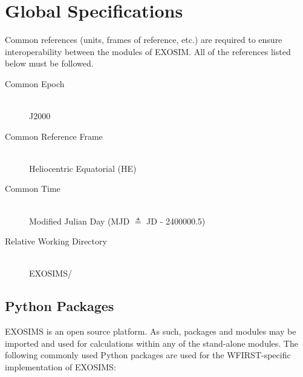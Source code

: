 \documentclass[cleanfoot]{asme2ej}
\begin{document}

\section{Global Specifications}
Common references (units, frames of reference, etc.) are required to ensure interoperability between the modules of EXOSIM.  All of the references listed below must be followed.

\begin{description}
    \item[Common Epoch] \hfill \\ J2000
    \item[Common Reference Frame] \hfill \\ Heliocentric Equatorial (HE)
    \item[Common Time] \hfill \\ Modified Julian Day (MJD $\triangleq$ JD - 2400000.5)
    \item[Relative Working Directory] \hfill \\ EXOSIMS/
\end{description}

\subsection{Python Packages} 
EXOSIMS is an open source platform.  As such, packages and modules may be imported and used for calculations within any of the stand-alone modules.  The following commonly used Python packages are used for the WFIRST-specific implementation of EXOSIMS:
\end{document}
